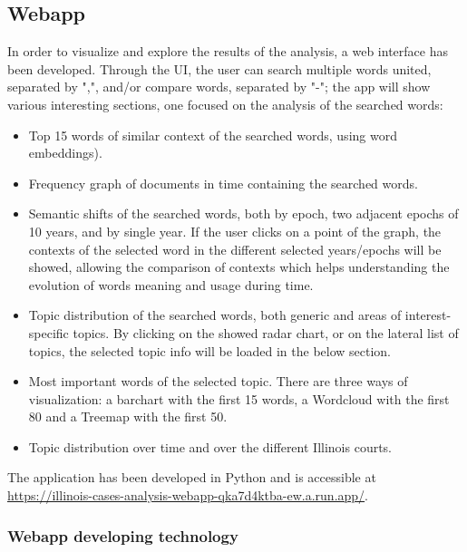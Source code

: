 \subsection{Webapp}
In order to visualize and explore the results of the analysis, a web interface has been developed. Through the UI, the
user can search multiple words united, separated by ",", and/or compare words, separated by "-"; the app will show
various interesting sections, one focused on the analysis of the searched words: 
\begin{itemize}
  \item Top 15 words of similar context of the searched words, using word embeddings).
  \item Frequency graph of documents in time containing the searched words.
  \item Semantic shifts of the searched words, both by epoch, two adjacent epochs of 10 years, and by single year.
    If the user clicks on a point of the graph, the contexts of the selected word in the different selected years/epochs
    will be showed, allowing the comparison of contexts which helps understanding the evolution of words meaning and usage
    during time.
  \item Topic distribution of the searched words, both generic and areas of interest-specific topics. By clicking on the
    showed radar chart, or on the lateral list of topics, the selected topic info will be loaded in the below section.
  \item Most important words of the selected topic. There are three ways of visualization: a barchart with the first 15
    words, a Wordcloud with the first 80 and a Treemap with the first 50.
  \item Topic distribution over time and over the different Illinois courts.
\end{itemize}
The application has been developed in Python and is accessible at
\url{https://illinois-cases-analysis-webapp-qka7d4ktba-ew.a.run.app/}.

\subsubsection{Webapp developing technology}


